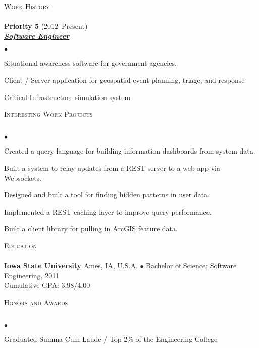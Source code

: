 \documentclass{article}
\newcommand{\lineunder} {
	\vspace*{-8pt} \\ \hspace*{-18pt} \hrulefill \\
}
\newcommand{\header}[1] {
	{\hspace*{-15pt}\vspace*{6pt} \textsc{#1}} \vspace*{-6pt} \lineunder
}
\newcommand{\employer}[3] {
	{ \textbf{#1} (#2)\\ \underline{\textbf{\emph{#3}}}\\  }
}
\newenvironment{achievements} {
	\begin{list}{$\bullet$}
		{\topsep 0pt \itemsep -2pt}
	}{
		\vspace*{4pt}\end{list}
	}
\newcommand{\school}[4] {
	\textbf{#1} #2 $\bullet$ #3\\
	\hspace*{15pt}#4 \\
	\vspace*{5pt}
}
\begin{document}
\header{Work History}

	\employer{Priority 5}{2012--Present}{Software Engineer}
		\begin{achievements}
         \item{Situational awareness software for government agencies.}
         \item{Client / Server application for geospatial event planning, triage, and response}
         \item{Critical Infrastructure simulation system}
		\end{achievements}

\header{Interesting Work Projects}

	\begin{achievements}
      \item{Created a query language for building information dashboards from system data.}
      \item{Built a system to relay updates from a REST server to a web app via Websockets.}
      \item{Designed and built a tool for finding hidden patterns in user data.}
      \item{Implemented a REST caching layer to improve query performance.}
      \item{Built a client library for pulling in ArcGIS feature data.}
   \end{achievements}

\header{Education}

	\school{Iowa State University}{Ames, IA, U.S.A.}{Bachelor of Science: Software Engineering, 2011}
	{Cumulative GPA: 3.98/4.00}

\header{Honors and Awards}

	\begin{achievements}
		\item{Graduated Summa Cum Laude / Top 2\% of the Engineering College}
	\end{achievements}
\end{document}
